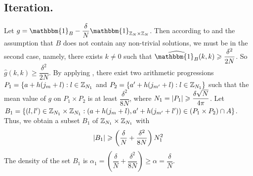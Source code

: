 \subsection{Iteration.}
Let $ g = \mathbbm{1}_B - \dfrac{\delta}{N} \mathbbm{1}_{\bbZ_N \times \bbZ_N} $. Then according to  and the assumption that $ B $ does not contain any non-trivial solutions, we must be in the second case, namely, there exists $ k \neq 0 $ such that $ \widehat{\mathbbm{1}_B}(k,k) \geq \dfrac{\delta^2}{2N} $. So $ \widehat{g}(k, k) \geq \dfrac{\delta^2}{2N} $. By applying , there exist two arithmetic progressions $ P_1  = \{ a + h(j_m + l): l \in {\mathbb Z}_{N_1} $ and $ P_2  = \{ a' + h(j_{m'} + l): l \in  {\mathbb Z}_{N_1} \} $ such that the mean value of $ g $ on $ P_1 \times P_2 $ is at least $ \dfrac{\delta^2}{8N} $, where $ N_1 = \left\vert{P_1}\right\vert \geqslant \dfrac{\delta \sqrt{N}}{4 \pi} $. Let $ B_1 = \{ (l, l') \in {\mathbb Z}_{N_1} \times {\mathbb Z}_{N_1}: (a + h(j_m + l), a' + h(j_{m'} + l')) \in (P_1 \times P_2) \cap A \} $. Thus, we obtain a subset $ B_1 $ of $ {\mathbb Z}_{N_1} \times {\mathbb Z}_{N_1} $ with 
$$ \left\vert{B_1}\right\vert \geqslant \left(\dfrac{\delta}{N} + \dfrac{\delta^2}{8N}\right) N_1^2 $$
The density of the set $ B_1 $ is $ \alpha_1 = \left(\dfrac{\delta}{N} + \dfrac{\delta^2}{8N}\right) \geq \alpha = \dfrac{\delta}{N} $.


